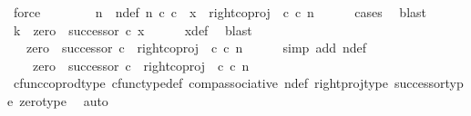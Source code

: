 \begin{isabellebody}
\ force\isanewline
\ \ \isamarkupfalse%
\isanewline
\ \ \isamarkupfalse%
\ \isamarkupfalse%
\ n\ \ n{\isacharunderscore}{\kern0pt}def{\isacharcolon}{\kern0pt}\ {\isachardoublequoteopen}n\ {\isasymin}\isactrlsub c\ {\isasymnat}\isactrlsub c\ {\isasymand}\ x\ {\isacharequal}{\kern0pt}\ {\isacharparenleft}{\kern0pt}right{\isacharunderscore}{\kern0pt}coproj\ {\isasymone}\ {\isasymnat}\isactrlsub c{\isacharparenright}{\kern0pt}\ {\isasymcirc}\isactrlsub c\ n{\isachardoublequoteclose}\isanewline
\ \ \ \ \isamarkupfalse%
\ cases\ \isamarkupfalse%
\ blast\isanewline
\ \ \isamarkupfalse%
\ \isamarkupfalse%
\ {\isachardoublequoteopen}k\ {\isacharequal}{\kern0pt}\ zero\ {\isasymamalg}\ successor\ {\isasymcirc}\isactrlsub c\ x{\isachardoublequoteclose}\isanewline
\ \ \ \ \isamarkupfalse%
\ x{\isacharunderscore}{\kern0pt}def\ \isamarkupfalse%
\ blast\isanewline
\ \ \isamarkupfalse%
\ \isamarkupfalse%
\ {\isachardoublequoteopen}{\isachardot}{\kern0pt}{\isachardot}{\kern0pt}{\isachardot}{\kern0pt}\ {\isacharequal}{\kern0pt}\ zero\ {\isasymamalg}\ successor\ {\isasymcirc}\isactrlsub c\ \ right{\isacharunderscore}{\kern0pt}coproj\ {\isasymone}\ {\isasymnat}\isactrlsub c\ {\isasymcirc}\isactrlsub c\ n{\isachardoublequoteclose}\isanewline
\ \ \ \ \isamarkupfalse%
\ {\isacharparenleft}{\kern0pt}simp\ add{\isacharcolon}{\kern0pt}\ n{\isacharunderscore}{\kern0pt}def{\isacharparenright}{\kern0pt}\isanewline
\ \ \isamarkupfalse%
\ \isamarkupfalse%
\ {\isachardoublequoteopen}{\isachardot}{\kern0pt}{\isachardot}{\kern0pt}{\isachardot}{\kern0pt}\ {\isacharequal}{\kern0pt}\ \ {\isacharparenleft}{\kern0pt}zero\ {\isasymamalg}\ successor\ {\isasymcirc}\isactrlsub c\ \ right{\isacharunderscore}{\kern0pt}coproj\ {\isasymone}\ {\isasymnat}\isactrlsub c{\isacharparenright}{\kern0pt}\ {\isasymcirc}\isactrlsub c\ n{\isachardoublequoteclose}\isanewline
\ \ \ \ \isamarkupfalse%
\ cfunc{\isacharunderscore}{\kern0pt}coprod{\isacharunderscore}{\kern0pt}type\ cfunc{\isacharunderscore}{\kern0pt}type{\isacharunderscore}{\kern0pt}def\ comp{\isacharunderscore}{\kern0pt}associative\ n{\isacharunderscore}{\kern0pt}def\ right{\isacharunderscore}{\kern0pt}proj{\isacharunderscore}{\kern0pt}type\ successor{\isacharunderscore}{\kern0pt}type\ zero{\isacharunderscore}{\kern0pt}type\ \isamarkupfalse%
\ auto\isanewline
\ \ \isamarkupfalse%

\end{isabellebody}
